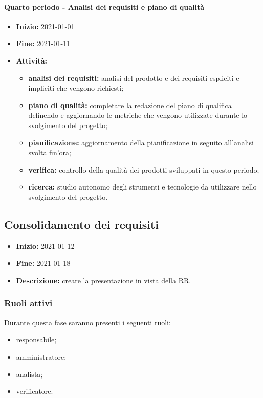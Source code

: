 \paragraph[Quarto periodo]{Quarto periodo - \textnormal{Analisi dei requisiti e piano di qualità}}
\begin{itemize}
    \item [] \textbf{Inizio:} 2021-01-01
    \item [] \textbf{Fine:} 2021-01-11
    \item [] \textbf{Attività:}
          \begin{itemize}
              \item \textbf{analisi dei requisiti:} analisi del prodotto e dei requisiti espliciti e impliciti che vengono richiesti;
              \item \textbf{piano di qualità:} completare la redazione del piano di qualifica definendo e aggiornando le metriche che vengono utilizzate durante lo svolgimento del progetto;
              \item \textbf{pianificazione:} aggiornamento della pianificazione in seguito all'analisi svolta fin'ora;
              \item \textbf{verifica:} controllo della qualità dei prodotti sviluppati in questo periodo;
              \item \textbf{ricerca:} studio autonomo degli strumenti e tecnologie da utilizzare nello svolgimento del progetto.
          \end{itemize}
\end{itemize}


\subsection{Consolidamento dei requisiti} \label{_pianificazioneConsolidamentoDeiRequisiti}
\begin{itemize}
    \item []\textbf{Inizio:} 2021-01-12
    \item []\textbf{Fine:} 2021-01-18
    \item []\textbf{Descrizione:} creare la presentazione in vista della RR.
\end{itemize}

\subsubsection{Ruoli attivi}
Durante questa fase saranno presenti i seguenti ruoli:
\begin{itemize}
    \item responsabile;
    \item amministratore;
    \item analista;
    \item verificatore.
\end{itemize}

